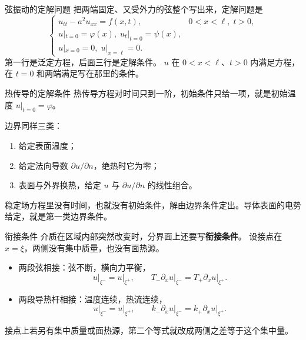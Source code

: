 \documentclass[fontset=windows, chinese, 10pt, xcolor=dvipsnames]{beamer}
\begin{document}
\begin{frame}{弦振动的定解问题}
  把两端固定、又受外力的弦整个写出来，定解问题是
  \begin{equation*}
    \begin{cases}
      u_{tt}-a^2 u_{xx}=f(x,t), & 0<x<\ell,\; t>0,\\
      u|_{t=0}=\varphi(x),\;
      u_t|_{t=0}=\psi(x),\\
      u|_{x=0}=0,\;
      u|_{x=\ell}=0.
    \end{cases}
  \end{equation*}
  第一行是泛定方程，后面三行是定解条件。
  $u$ 在 $0<x<\ell$、$t>0$ 内满足方程，在 $t=0$ 和两端满足写在那里的条件。
\end{frame}

\begin{frame}{热传导的定解条件}
  热传导方程对时间只到一阶，初始条件只给一项，就是初始温度 $u|_{t=0}=\varphi$。
  \vspace{0.35em}

  边界同样三类：
  \begin{enumerate}
    \item[(I)] 给定表面温度；
    \item[(II)] 给定法向导数 $\partial u/\partial n$，绝热时它为零；
    \item[(III)] 表面与外界换热，给定 $u$ 与 $\partial u/\partial n$ 的线性组合。
  \end{enumerate}
  \vspace{0.25em}
  稳定场方程里没有时间，也就没有初始条件，解由边界条件定出。导体表面的电势给定，就是第一类边界条件。
\end{frame}

\begin{frame}{衔接条件}
  介质在区域内部突然改变时，分界面上还要写\textbf{衔接条件}。
  设接点在 $x=\xi$，两侧没有集中质量，也没有面热源。
  \begin{itemize}
    \item 两段弦相接：弦不断，横向力平衡，
      \begin{equation*}
        u\big|_{\xi^-}=u\big|_{\xi^+},\qquad
        T_-\partial_x u\big|_{\xi^-}=T_+\partial_x u\big|_{\xi^+}.
      \end{equation*}
    \item 两段导热杆相接：温度连续，热流连续，
      \begin{equation*}
        u\big|_{\xi^-}=u\big|_{\xi^+},\qquad
        k_-\partial_x u\big|_{\xi^-}=k_+\partial_x u\big|_{\xi^+}.
      \end{equation*}
  \end{itemize}
  接点上若另有集中质量或面热源，第二个等式就改成两侧之差等于这个集中量。
\end{frame}
\end{document}
